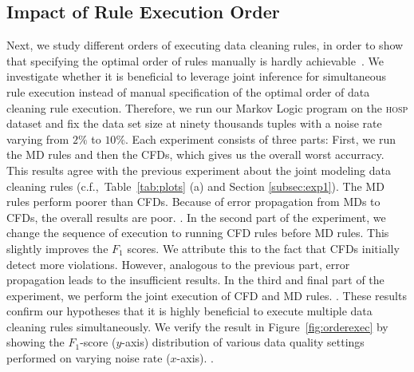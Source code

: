 \subsection{Impact of Rule Execution Order}
Next, we study different orders of executing data cleaning rules, in order to show that specifying the optimal order of rules manually is hardly achievable~\cite{Dallachiesa:2013:NCD:2463676.2465327}. We investigate whether it is beneficial to leverage joint inference for simultaneous rule execution instead of manual specification of the optimal order of data cleaning rule execution. Therefore, we run our Markov Logic program on the \textsc{hosp} dataset and fix the data set size at ninety thousands tuples with a noise rate varying from $2\%$ to $10\%$. Each experiment consists of three parts: First, we run the MD rules and then the CFDs, which gives us the overall worst accurracy. This results agree with the previous experiment about the joint modeling data cleaning rules (c.f.,~Table~\ref{tab:plots} (a) and Section \ref{subsec:exp1}). The MD rules perform poorer than CFDs. Because of error propagation from MDs to CFDs, the overall results are poor. . In the second part of the experiment, we change the sequence of execution to running CFD rules before MD rules. This slightly improves the $F_1$ scores. We attribute this to the fact that CFDs initially detect more violations. However, analogous to the previous part, error propagation leads to the insufficient results. In the third and final part of the experiment, we perform the joint execution of CFD and MD rules. . These results confirm our hypotheses that it is highly beneficial to execute multiple data cleaning rules simultaneously. We verify the result in Figure~\ref{fig:orderexec} by showing the $F_1$-score ($y$-axis) distribution of various data quality settings performed on varying noise rate ($x$-axis). .
 

